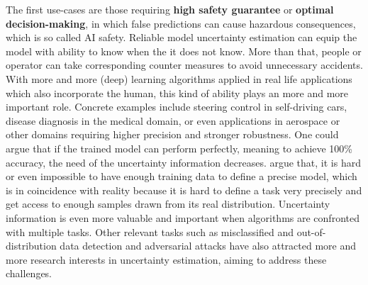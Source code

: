 The first use-cases are those requiring \textbf{high safety guarantee} or \textbf{optimal decision-making}, in which false predictions can cause hazardous consequences, which is so called AI safety\cite{amodei2016concrete}. Reliable model uncertainty estimation can equip the model with ability to know when the it does not know. More than that, people or operator can take corresponding counter measures to avoid unnecessary accidents. With more and more (deep) learning algorithms applied in real life applications which also incorporate the human, this kind of ability plays an more and more important role. Concrete examples include steering control in self-driving cars\cite{mcallister2017concrete}, disease diagnosis in the medical domain\cite{leibig2017leveraging}, or even applications in aerospace or other domains requiring higher precision and stronger robustness. One could argue that if the trained model can perform perfectly, meaning to achieve 100\% accuracy, the need of the uncertainty information decreases. 
\cite{denker1991transforming} argue that, it is hard or even impossible to have enough training data to define a precise model, which is in coincidence with reality because it is hard to define a task very precisely and get access to enough samples drawn from its real distribution. Uncertainty information is even more valuable and important when algorithms are confronted with multiple tasks\cite{kendall2017multi}. Other relevant tasks such as misclassified 
and out-of-distribution data detection\cite{hendrycks2016baseline} and adversarial attacks \cite{kurakin2016adversarial, feinman2017detecting} 
have also attracted more and more research interests in uncertainty estimation, aiming to address these challenges.


